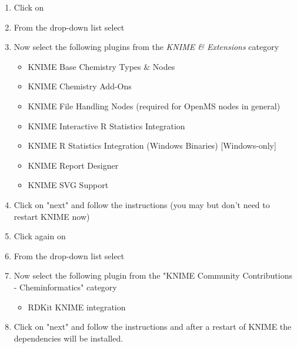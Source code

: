 \begin{enumerate}
\item Click on 
\item From the  drop-down list select \menu{\KnimeUpdateSite}
\item Now select the following plugins from the \textit{KNIME \& Extensions} category
    \begin{itemize}
    \item KNIME Base Chemistry Types \& Nodes
    \item KNIME Chemistry Add-Ons
    \item KNIME File Handling Nodes (required for OpenMS nodes in general)
    \item KNIME Interactive R Statistics Integration
    \item KNIME R Statistics Integration (Windows Binaries) [Windows-only]
    \item KNIME Report Designer
    \item KNIME SVG Support
    \end{itemize}
\item Click on "next" and follow the instructions (you may but don't need to restart KNIME now)
\item Click again on 
\item From the  drop-down list select \\\menu{\KnimeTrustedSite}
\item Now select the following plugin from the "KNIME Community Contributions - Cheminformatics" category 	
    \begin{itemize}
    \item     RDKit KNIME integration
    \end{itemize}	
\item Click on "next" and follow the instructions and after a restart of KNIME the dependencies will be installed.
\end{enumerate}

